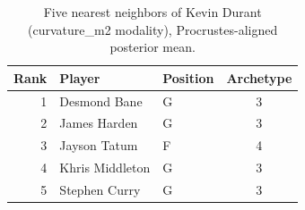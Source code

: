 \begin{table}[htbp]
  \centering\small
  \begin{tabular}{rllc}
    \toprule
    Rank & Player & Position & Archetype \\
    \midrule
    1 & Desmond Bane & G & 3 \\
    2 & James Harden & G & 3 \\
    3 & Jayson Tatum & F & 4 \\
    4 & Khris Middleton & G & 3 \\
    5 & Stephen Curry & G & 3 \\
    \bottomrule
  \end{tabular}
  \caption{Five nearest neighbors of Kevin Durant (curvature_m2 modality), Procrustes-aligned posterior mean.}
  \label{tab:Kevin_Durant_neighbors_curvature_m2}
\end{table}

